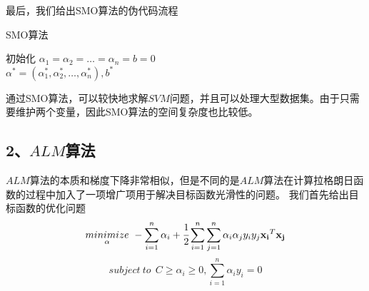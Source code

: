 \documentclass{article}
\begin{document}
最后，我们给出SMO算法的伪代码流程

\begin{algorithm}[H]
    \caption{SMO算法}
    初始化 $\alpha_1= \alpha_2 = \dots = \alpha_n = b = 0$\\
    \Return $\alpha^{*} = (\alpha_1^{*},\alpha_2^{*},\dots,\alpha_n^{*}), b^{*}$
\end{algorithm} 
    

通过SMO算法，可以较快地求解$SVM$问题，并且可以处理大型数据集。由于只需要维护两个变量，因此SMO算法的空间复杂度也比较低。

\subsection*{\Large 2、$ALM$算法}
$ALM$算法的本质和梯度下降非常相似，但是不同的是$ALM$算法在计算拉格朗日函数的过程中加入了一项增广项用于解决目标函数光滑性的问题。
我们首先给出目标函数的优化问题
$$\underset{\alpha}{minimize}\ -\sum_{i=1}^n \alpha_i+\cfrac{1}{2}\sum_{i=1}^    n \sum_{j=1}^n\alpha_i\alpha_jy_iy_j\mathbf{x_i}^T\mathbf{x_j}$$
$$ subject\ to\ \  C\geq \alpha_i \geq 0, \sum_{i=1}^n \alpha_iy_i=0$$
\end{document}
